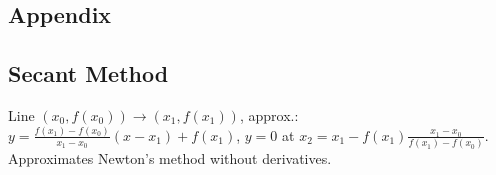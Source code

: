 \documentclass[11pt,landscape,a4paper,fleqn]{article}
\begin{document}
\begin{multicols*}{3}
\section{Appendix}

\subsection*{Secant Method}

Line $(x_0, f(x_0)) \to (x_1, f(x_1))$, approx.:
$y = \frac{f(x_1) - f(x_0)}{x_1 - x_0}(x - x_1) + f(x_1)$,
$y = 0$ at $x_2 = x_1 - f(x_1) \frac{x_1 - x_0}{f(x_1) - f(x_0)}$.
Approximates Newton's method without derivatives.

\end{multicols*}
\end{document}
